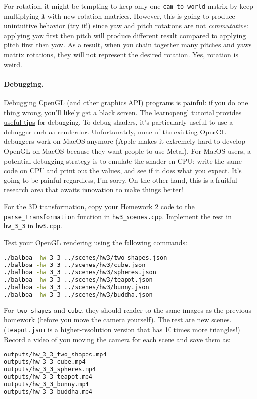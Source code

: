 For rotation, it might be tempting to keep only one \lstinline{cam_to_world} matrix by keep multiplying it with new rotation matrices. However, this is going to produce unintuitive behavior (try it!) since yaw and pitch rotations are not \emph{commutative}: applying yaw first then pitch will produce different result compared to applying pitch first then yaw. As a result, when you chain together many pitches and yaws matrix rotations, they will not represent the desired rotation. Yes, rotation is weird.

\paragraph{Debugging.} Debugging OpenGL (and other graphics API) programs is painful: if you do one thing wrong, you'll likely get a black screen. The learnopengl tutorial provides \href{https://learnopengl.com/In-Practice/Debugging}{useful tips} for debugging. To debug shaders, it's particularly useful to use a debugger such as \href{https://renderdoc.org/}{renderdoc}. Unfortunately, none of the existing OpenGL debuggers work on MacOS anymore (Apple makes it extremely hard to develop OpenGL on MacOS because they want people to use Metal). For MacOS users, a potential debugging strategy is to emulate the shader on CPU: write the same code on CPU and print out the values, and see if it does what you expect. It's going to be painful regardless, I'm sorry. On the other hand, this is a fruitful research area that awaits innovation to make things better!

For the 3D transformation, copy your Homework 2 code to the \lstinline{parse_transformation} function in \lstinline{hw3_scenes.cpp}. Implement the rest in \lstinline{hw_3_3} in \lstinline{hw3.cpp}.

Test your OpenGL rendering using the following commands:
\begin{lstlisting}[language=bash]
./balboa -hw 3_3 ../scenes/hw3/two_shapes.json
./balboa -hw 3_3 ../scenes/hw3/cube.json
./balboa -hw 3_3 ../scenes/hw3/spheres.json
./balboa -hw 3_3 ../scenes/hw3/teapot.json
./balboa -hw 3_3 ../scenes/hw3/bunny.json
./balboa -hw 3_3 ../scenes/hw3/buddha.json
\end{lstlisting}

For \lstinline{two_shapes} and \lstinline{cube}, they should render to the same images as the previous homework (before you move the camera yourself). The rest are new scenes. (\lstinline{teapot.json} is a higher-resolution version that has 10 times more triangles!) Record a video of you moving the camera for each scene and save them as:
\begin{lstlisting}[language=bash]
outputs/hw_3_3_two_shapes.mp4
outputs/hw_3_3_cube.mp4
outputs/hw_3_3_spheres.mp4
outputs/hw_3_3_teapot.mp4
outputs/hw_3_3_bunny.mp4
outputs/hw_3_3_buddha.mp4
\end{lstlisting}

